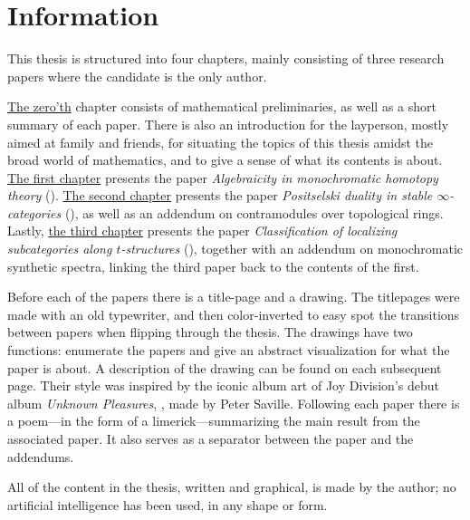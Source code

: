
\section*{Information}

This thesis is structured into four chapters, mainly consisting of three research papers where the candidate is the only author.

\hyperref[ch0]{The zero'th} chapter consists of mathematical preliminaries, as well as a short summary of each paper. There is also an introduction for the layperson, mostly aimed at family and friends, for situating the topics of this thesis amidst the broad world of mathematics, and to give a sense of what its contents is about. \hyperref[ch1]{The first chapter} presents the paper \emph{Algebraicity in monochromatic homotopy theory} (\cite{aambo_2024_algebraicity}). \hyperref[ch2]{The second chapter} presents the paper \emph{Positselski duality in stable $\infty$-categories} (\cite{aambo_2024_positselski}), as well as an addendum on contramodules over topological rings. Lastly, \hyperref[ch3]{the third chapter} presents the paper \emph{Classification of localizing subcategories along $t$-structures} (\cite{aambo_2024_localizing}), together with an addendum on monochromatic synthetic spectra, linking the third paper back to the contents of the first. 

Before each of the papers there is a title-page and a drawing. The titlepages were made with an old typewriter, and then color-inverted to easy spot the transitions between papers when flipping through the thesis. The drawings have two functions: enumerate the papers and give an abstract visualization for what the paper is about. A description of the drawing can be found on each subsequent page. Their style was inspired by the iconic album art of Joy Division's debut album \emph{Unknown Pleasures}, \cite{joy-division_79}, made by Peter Saville.  Following each paper there is a poem---in the form of a limerick---summarizing the main result from the associated paper. It also serves as a separator between the paper and the addendums. 

All of the content in the thesis, written and graphical, is made by the author; no artificial intelligence has been used, in any shape or form. 